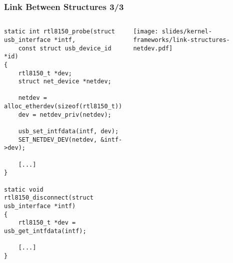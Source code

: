 \begin{frame}[fragile]
  \frametitle{Link Between Structures 3/3}
  \begin{columns}
    \begin{verbatim}
static int rtl8150_probe(struct usb_interface *intf,
    const struct usb_device_id *id)
{
    rtl8150_t *dev;
    struct net_device *netdev;

    netdev = alloc_etherdev(sizeof(rtl8150_t));
    dev = netdev_priv(netdev);

    usb_set_intfdata(intf, dev);
    SET_NETDEV_DEV(netdev, &intf->dev);

    [...]
}

static void rtl8150_disconnect(struct usb_interface *intf)
{
    rtl8150_t *dev = usb_get_intfdata(intf);

    [...]
}
    \end{verbatim}
    \begin{center}
      \texttt{[image: slides/kernel-frameworks/link-structures-netdev.pdf]}
    \end{center}
  \end{columns}
\end{frame}
